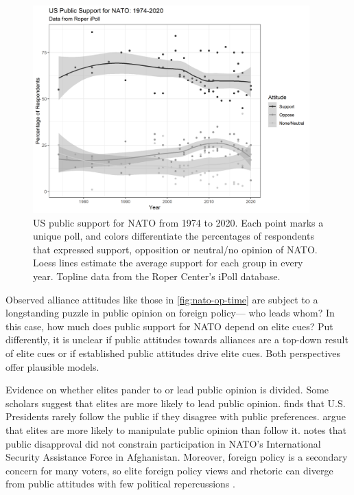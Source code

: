 \documentclass[12pt]{article}
\begin{document}
\begin{figure}
	\centering
		\includegraphics[width=0.95\textwidth]{../figures/nato-op-time.png}
	\caption{US public support for NATO from 1974 to 2020. Each point marks a unique poll, and colors differentiate the percentages of respondents that expressed support, opposition or neutral/no opinion of NATO. Loess lines estimate the average support for each group in every year. Topline data from the Roper Center's iPoll database.}
	\label{fig:nato-op-time}
\end{figure}



Observed alliance attitudes like those in \autoref{fig:nato-op-time} are subject to a longstanding puzzle in public opinion on foreign policy--- who leads whom? 
In this case, how much does public support for NATO depend on elite cues? 
Put differently, it is unclear if public attitudes towards alliances are a top-down result of elite cues or if established public attitudes drive elite cues. 
Both perspectives offer plausible models. 


Evidence on whether elites pander to or lead public opinion is divided.
Some scholars suggest that elites are more likely to lead public opinion. 
\citet{Canes-Wrone2006} finds that U.S. Presidents rarely follow the public if they disagree with public preferences.
\citet{JacobsShapiro2000} argue that elites are more likely to manipulate public opinion than follow it. 
\citet{Kreps2010} notes that public disapproval did not constrain participation in NATO's International Security Assistance Force in Afghanistan. 
Moreover, foreign policy is a secondary concern for many voters, so elite foreign policy views and rhetoric can diverge from public attitudes with few political repercussions \citep{BusbyMonten2012}. 
\end{document}

